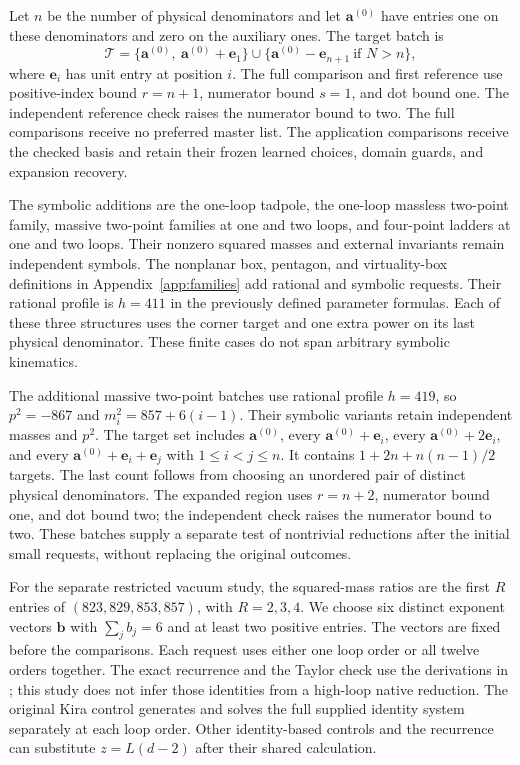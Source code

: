 Let $n$ be the number of physical denominators and let $\boldsymbol a^{(0)}$ have entries one on these denominators and zero on the auxiliary ones. The target batch is
\begin{equation}
\mathcal T=\{\boldsymbol a^{(0)},\ \boldsymbol a^{(0)}+\boldsymbol e_1\}
\cup\{\boldsymbol a^{(0)}-\boldsymbol e_{n+1}\ \text{if }N>n\},
\end{equation}
where $\boldsymbol e_i$ has unit entry at position $i$. The full comparison and first reference use positive-index bound $r=n+1$, numerator bound $s=1$, and dot bound one. The independent reference check raises the numerator bound to two. The full comparisons receive no preferred master list. The application comparisons receive the checked basis and retain their frozen learned choices, domain guards, and expansion recovery.

The symbolic additions are the one-loop tadpole, the one-loop massless two-point family, massive two-point families at one and two loops, and four-point ladders at one and two loops. Their nonzero squared masses and external invariants remain independent symbols. The nonplanar box, pentagon, and virtuality-box definitions in Appendix~\ref{app:families} add rational and symbolic requests. Their rational profile is $h=411$ in the previously defined parameter formulas. Each of these three structures uses the corner target and one extra power on its last physical denominator. These finite cases do not span arbitrary symbolic kinematics.

The additional massive two-point batches use rational profile $h=419$, so $p^2=-867$ and $m_i^2=857+6(i-1)$. Their symbolic variants retain independent masses and $p^2$. The target set includes $\boldsymbol a^{(0)}$, every $\boldsymbol a^{(0)}+\boldsymbol e_i$, every $\boldsymbol a^{(0)}+2\boldsymbol e_i$, and every $\boldsymbol a^{(0)}+\boldsymbol e_i+\boldsymbol e_j$ with $1\leq i<j\leq n$. It contains $1+2n+n(n-1)/2$ targets. The last count follows from choosing an unordered pair of distinct physical denominators. The expanded region uses $r=n+2$, numerator bound one, and dot bound two; the independent check raises the numerator bound to two. These batches supply a separate test of nontrivial reductions after the initial small requests, without replacing the original outcomes.

For the separate restricted vacuum study, the squared-mass ratios are the first $R$ entries of $(823,829,853,857)$, with $R=2,3,4$. We choose six distinct exponent vectors $\boldsymbol b$ with $\sum_j b_j=6$ and at least two positive entries. The vectors are fixed before the comparisons. Each request uses either one loop order or all twelve orders together. The exact recurrence and the Taylor check use the derivations in \CoverageVacuumDerivation{}; this study does not infer those identities from a high-loop native reduction. The original Kira control generates and solves the full supplied identity system separately at each loop order. Other identity-based controls and the recurrence can substitute $z=L(d-2)$ after their shared calculation.


